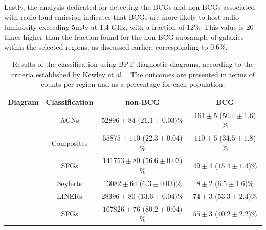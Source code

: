 Lastly, the analysis dedicated for detecting the BCGs and non-BCGs associated with radio loud emission indicates that BCGs are more likely to host radio luminosity exceeding 5mJy at 1.4 GHz, with a fraction of $12\%$. This value is 20 times higher than the fraction found for the non-BCG subsample of galaxies within the selected regions, as discussed earlier, corresponding to $0.6\%$.

\begin{table}[htb]
  \centering
  \begin{tabular}{cccc}
    \hline\hline
    \multicolumn{1}{c}{Diagram} & Classification & non-BCG & BCG \\
    \hline
    [NII]  & AGNs &  $52896 \pm 84$ ($21.1 \pm 0.03$)$\%$ &$161 \pm 5$ ($50.4 \pm 1.6$)$\%$ \\
           & Composites & $55875 \pm 110$ ($22.3 \pm 0.04$)$\%$ & $110 \pm 5$ ($34.5 \pm 1.8$)$\%$ \\
           & SFGs & $141753 \pm 80$ ($56.6 \pm 0.03$)$\%$ &$ 49 \pm 4$ ($15.4 \pm 1.4$)$\%$ \\ 
    \hline
    [SII]  & Seyferts & $13082 \pm 64$ ($6.3 \pm 0.03$)$\%$  &$8 \pm 2$ ($6.5 \pm 1.6$)$\%$\\
           & LINERs & $28396 \pm 80$ ($13.6 \pm 0.04$)$\%$ & $74 \pm 3$ ($53.3 \pm 2.4$)$\%$ \\
           & SFGs &$167826\pm 76 $ ($80.2 \pm 0.04$)$\%$ & $55 \pm 3$ ($40.2 \pm 2.2$)$\%$\\ 
    \hline\hline
  \end{tabular}
  \caption{Results of the classification using BPT diagnostic diagrams, according to the criteria established by Kewley et al. \cite{2006MNRAS.372..961K}. The outcomes are presented in terms of counts per region and as a percentage for each population. }
  \label{tab:Optical}
\end{table}


